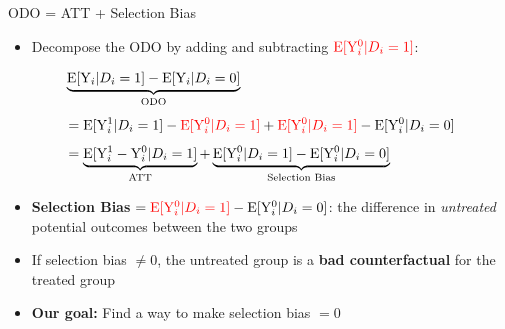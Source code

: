 \documentclass[hyperref={pdfpagelabels=false}]{beamer}
\begin{document}
\begin{frame}{ODO = ATT + Selection Bias}
	\begin{itemize}
		\item Decompose the ODO by adding and subtracting ${\color{red}\mathrm{E}[\mathrm{Y}^{0}_{i}|D_i=1]}$:
	\end{itemize}
	\begin{equation*}
		\begin{aligned}
			&\underbrace{\mathrm{E}[\mathrm{Y}_{i}|D_i=1] - \mathrm{E}[\mathrm{Y}_{i}|D_i=0]}_{\text{ODO}} \\[4pt]
			&= \mathrm{E}[\mathrm{Y}^{1}_{i}|D_i=1]-{\color{red}\mathrm{E}[\mathrm{Y}^{0}_{i}|D_i=1]}+{\color{red}\mathrm{E}[\mathrm{Y}^{0}_{i}|D_i=1]}-\mathrm{E}[\mathrm{Y}^{0}_{i}|D_i=0] \\[4pt]
			&= \underbrace{\mathrm{E}[\mathrm{Y}^{1}_{i}-\mathrm{Y}^{0}_{i}|D_i=1]}_{\text{ATT}} + \underbrace{\mathrm{E}[\mathrm{Y}^{0}_{i}|D_i=1]-\mathrm{E}[\mathrm{Y}^{0}_{i}|D_i=0]}_{\text{Selection Bias}}
		\end{aligned}
	\end{equation*}
	\begin{itemize}
		\item \textbf{Selection Bias} $= {\color{red}\mathrm{E}[\mathrm{Y}^{0}_{i}|D_i=1]} - \mathrm{E}[\mathrm{Y}^{0}_{i}|D_i=0]$: the difference in \emph{untreated} potential outcomes between the two groups
		\vspace{0.2cm}
		\item If selection bias $\neq 0$, the untreated group is a \textbf{bad counterfactual} for the treated group
		\vspace{0.2cm}
		\item \textbf{Our goal:} Find a way to make selection bias $= 0$
	\end{itemize}
\end{frame}
\end{document}
